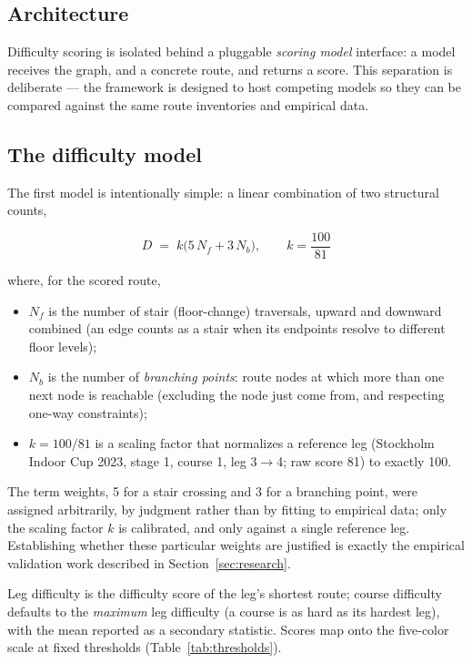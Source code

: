 \documentclass[11pt,a4paper,twocolumn]{article}
\begin{document}
\subsection{Architecture}

Difficulty scoring is isolated behind a pluggable \emph{scoring model}
interface: a model receives the graph, and a concrete route, and returns a score. This separation is deliberate ---
the framework is designed to host competing models so they can be compared
against the same route inventories and empirical data.

\subsection{The difficulty model}

The first model is intentionally simple: a linear combination of two
structural counts,

\[
D \;=\; k \bigl(5\,N_f + 3\,N_b\bigr), \qquad k = \frac{100}{81}
\]

where, for the scored route,

\begin{itemize}
    \item $N_f$ is the number of stair (floor-change) traversals, upward and
          downward combined (an edge counts as a stair when its endpoints
          resolve to different floor levels);
    \item $N_b$ is the number of \emph{branching points}: route nodes at
          which more than one next node is reachable (excluding the node
          just come from, and respecting one-way constraints);
    \item $k = 100/81$ is a scaling factor that normalizes a reference leg
          (Stockholm Indoor Cup 2023, stage 1, course 1, leg 3$\to$4; raw
          score 81) to exactly 100.
\end{itemize}

The term weights, 5 for a stair crossing and 3 for a branching point, were
assigned arbitrarily, by judgment rather than by fitting to empirical data;
only the scaling factor $k$ is calibrated, and only against a single
reference leg. Establishing whether these particular weights are justified
is exactly the empirical validation work described in
Section~\ref{sec:research}.

Leg difficulty is the difficulty score of the leg's shortest route; course
difficulty defaults to the \emph{maximum} leg difficulty (a course is as hard
as its hardest leg), with the mean reported as a secondary statistic. Scores
map onto the five-color scale at fixed thresholds
(Table~\ref{tab:thresholds}).
\end{document}
